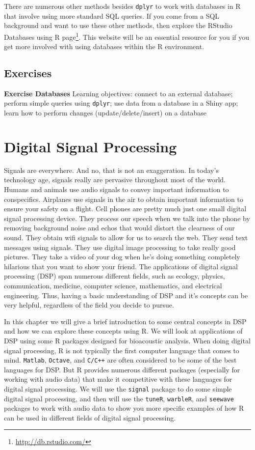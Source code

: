 \documentclass[]{krantz}
\renewcommand{\href}[2]{#2\footnote{\url{#1}}}
\begin{document}
There are numerous other methods besides \texttt{dplyr} to work with
databases in R that involve using more standard SQL queries. If you come
from a SQL background and want to use these other methods, then explore
the \href{http://db.rstudio.com/}{RStudio Databases using R page}. This
website will be an essential resource for you if you get more involved
with using databases within the R environment.

\section{Exercises}\label{exercises-10}

\textbf{Exercise Databases} Learning objectives: connect to an external
database; perform simple queries using \texttt{dplyr}; use data from a
database in a Shiny app; learn how to perform changes
(update/delete/insert) on a database

\chapter{Digital Signal Processing}\label{digital-signal-processing}

Signals are everywhere. And no, that is not an exaggeration. In today's
technology age, signals really are pervasive throughout most of the
world. Humans and animals use audio signals to convey important
information to conspecifics. Airplanes use signals in the air to obtain
important information to ensure your safety on a flight. Cell phones are
pretty much just one small digital signal processing device. They
process our speech when we talk into the phone by removing background
noise and echos that would distort the clearness of our sound. They
obtain wifi signals to allow for us to search the web. They send text
messages using signals. They use digital image processing to take really
good pictures. They take a video of your dog when he's doing something
completely hilarious that you want to show your friend. The applications
of digital signal processing (DSP) span numerous different fields, such
as ecology, physics, communication, medicine, computer science,
mathematics, and electrical engineering. Thus, having a basic
understanding of DSP and it's concepts can be very helpful, regardless
of the field you decide to pursue.

In this chapter we will give a brief introduction to some central
concepts in DSP and how we can explore these concepts using R. We will
look at applications of DSP using some R packages designed for
bioacoustic analysis. When doing digital signal processing, R is not
typically the first computer language that comes to mind.
\texttt{Matlab}, \texttt{Octave}, and \texttt{C/C++} are often
considered to be some of the best languages for DSP. But R provides
numerous different packages (especially for working with audio data)
that make it competitive with these languages for digital signal
processing. We will use the \texttt{signal} package to do some simple
digital signal processing, and then will use the \texttt{tuneR},
\texttt{warbleR}, and \texttt{seewave} packages to work with audio data
to show you more specific examples of how R can be used in different
fields of digital signal processing.
\end{document}
